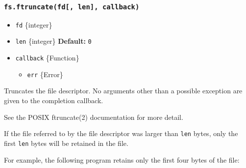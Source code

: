 \subsubsection{\texorpdfstring{\texttt{fs.ftruncate(fd{[},\ len{]},\ callback)}}{fs.ftruncate(fd{[}, len{]}, callback)}}\label{fs.ftruncatefd-len-callback}

\begin{itemize}
\tightlist
\item
  \texttt{fd} \{integer\}
\item
  \texttt{len} \{integer\} \textbf{Default:} \texttt{0}
\item
  \texttt{callback} \{Function\}

  \begin{itemize}
  \tightlist
  \item
    \texttt{err} \{Error\}
  \end{itemize}
\end{itemize}

Truncates the file descriptor. No arguments other than a possible
exception are given to the completion callback.

See the POSIX ftruncate(2) documentation for more detail.

If the file referred to by the file descriptor was larger than
\texttt{len} bytes, only the first \texttt{len} bytes will be retained
in the file.

For example, the following program retains only the first four bytes of
the file:

